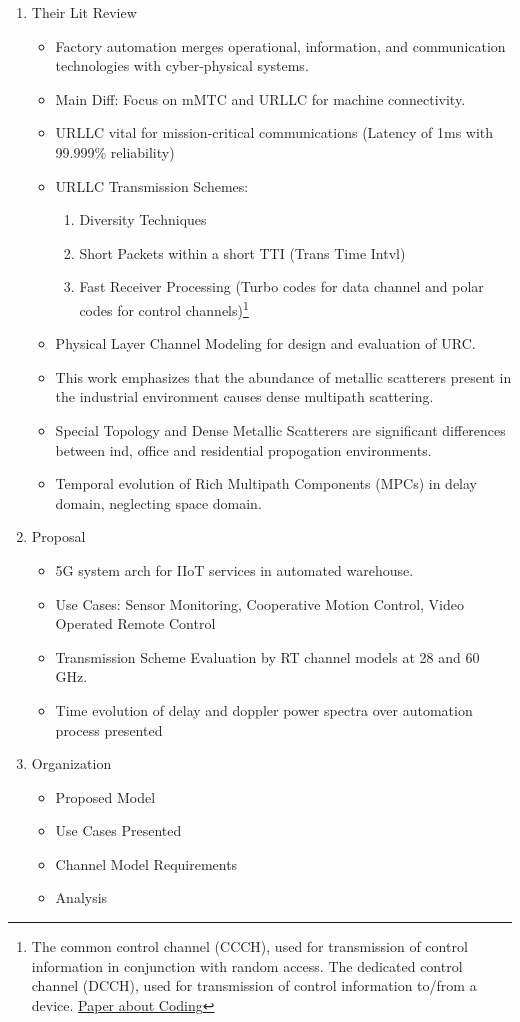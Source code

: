 \documentclass[11pt]{article}
\begin{document}
\begin{enumerate}
\item Their Lit Review
\label{sec:orgdf6e7c0}
\begin{itemize}
\item Factory automation merges operational, information, and communication technologies with cyber-physical systems.
\item Main Diff: Focus on mMTC and URLLC for machine connectivity.
\item URLLC vital for mission-critical communications (Latency of 1ms with 99.999\% reliability)
\item URLLC Transmission Schemes:
\begin{enumerate}
\item Diversity Techniques
\item Short Packets within a short TTI (Trans Time Intvl)
\item Fast Receiver Processing (Turbo codes for data channel and polar codes for control channels)\footnote{The common control channel (CCCH), used for transmission of control information in conjunction with random access. The dedicated control channel (DCCH), used for transmission of control information to/from a device. \href{https://klevas.mif.vu.lt/\~skersys/vsd/turbo/0429hage.pdf}{Paper about Coding}}
\end{enumerate}
\item Physical Layer Channel Modeling for design and evaluation of URC.
\item This work emphasizes that the abundance of metallic scatterers present in the industrial environment causes dense multipath scattering.
\item Special Topology and Dense Metallic Scatterers are significant differences between ind, office and residential propogation environments.
\item Temporal evolution of Rich Multipath Components (MPCs) in delay domain, neglecting space domain.
\end{itemize}
\item Proposal
\label{sec:org9915e15}
\begin{itemize}
\item 5G system arch for IIoT services in automated warehouse.
\item Use Cases: Sensor Monitoring, Cooperative Motion Control, Video Operated Remote Control
\item Transmission Scheme Evaluation by RT channel models at 28 and 60 GHz.
\item Time evolution of delay and doppler power spectra over automation process presented
\end{itemize}
\item Organization
\label{sec:orgc77220d}
\begin{itemize}
\item Proposed Model
\item Use Cases Presented
\item Channel Model Requirements
\item Analysis
\end{itemize}
\end{enumerate}
\end{document}
